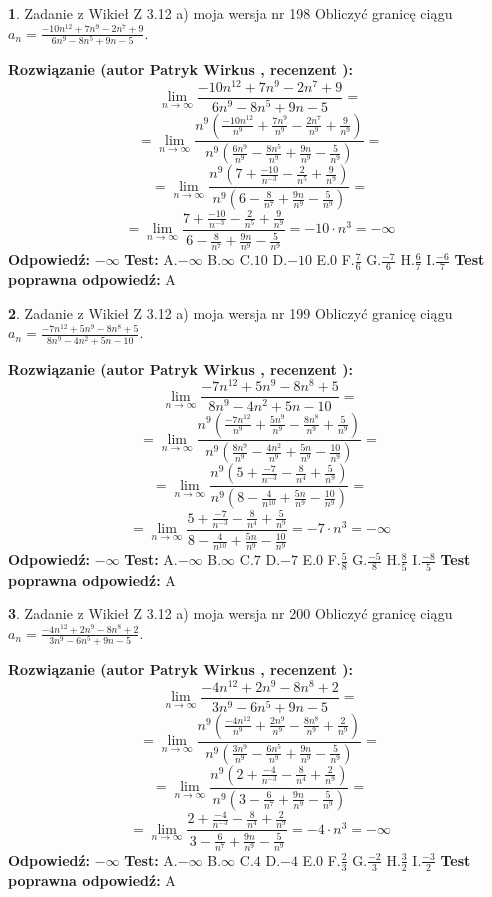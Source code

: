 \documentclass[12pt, a4paper]{article}
\theoremstyle{definition} %
\newtheorem{zad}{}
\newcommand{\zadStart}[1]{\begin{zad}#1\newline}
\newcommand{\zadStop}{\end{zad}}
\newcommand{\rozwStart}[2]{\noindent \textbf{Rozwiązanie (autor #1 , recenzent #2): }\newline}
\newcommand{\rozwStop}{\newline}
\newcommand{\odpStart}{\noindent \textbf{Odpowiedź:}\newline}
\newcommand{\odpStop}{\newline}
\newcommand{\testStart}{\noindent \textbf{Test:}\newline}
\newcommand{\testStop}{\newline}
\newcommand{\kluczStart}{\noindent \textbf{Test poprawna odpowiedź:}\newline}
\newcommand{\kluczStop}{\newline}
\begin{document}
\zadStart{Zadanie z Wikieł Z 3.12 a) moja wersja nr 198}
Obliczyć granicę ciągu $a_{n}=\frac{-10n^{12}+7n^{9}-2n^{7}+9}{6n^{9}-8n^{5}+9n-5}$.
\zadStop
\rozwStart{Patryk Wirkus}{}
$$\lim\limits_{n\to\infty}\frac{-10n^{12}+7n^{9}-2n^{7}+9}{6n^{9}-8n^{5}+9n-5}=$$
$$=\lim\limits_{n\to\infty}\frac{n^{9}\left(\frac{-10n^{12}}{n^{9}}+\frac{7n^{9}}{n^{9}}-\frac{2n^{7}}{n^{9}}+\frac{9}{n^{9}}\right)}{n^{9}\left(\frac{6n^{9}}{n^{9}}-\frac{8n^{5}}{n^{9}}+\frac{9n}{n^{9}}-\frac{5}{n^{9}}\right)}=$$
$$=\lim\limits_{n\to\infty}\frac{n^{9}\left(7+\frac{-10}{n^{-3}}-\frac{2}{n^{5}}+\frac{9}{n^{9}}\right)}
{n^{9}\left(6-\frac{8}{n^{7}}+\frac{9n}{n^{9}}-\frac{5}{n^{9}}\right)}=$$
$$=\lim\limits_{n\to\infty}\frac{7+\frac{-10}{n^{-3}}-\frac{2}{n^{5}}+\frac{9}{n^{9}}}{6-\frac{8}{n^{7}}+\frac{9n}{n^{9}}-\frac{5}{n^{9}}}=-10\cdot n^{3} = -\infty$$
\rozwStop
\odpStart
$-\infty$
\odpStop
\testStart
A.$-\infty$
B.$\infty$
C.$10$
D.$-10$
E.$0$
F.$\frac{7}{6}$
G.$\frac{-7}{6}$
H.$\frac{6}{7}$
I.$\frac{-6}{7}$
\testStop
\kluczStart
A
\kluczStop



\zadStart{Zadanie z Wikieł Z 3.12 a) moja wersja nr 199}
Obliczyć granicę ciągu $a_{n}=\frac{-7n^{12}+5n^{9}-8n^{8}+5}{8n^{9}-4n^{2}+5n-10}$.
\zadStop
\rozwStart{Patryk Wirkus}{}
$$\lim\limits_{n\to\infty}\frac{-7n^{12}+5n^{9}-8n^{8}+5}{8n^{9}-4n^{2}+5n-10}=$$
$$=\lim\limits_{n\to\infty}\frac{n^{9}\left(\frac{-7n^{12}}{n^{9}}+\frac{5n^{9}}{n^{9}}-\frac{8n^{8}}{n^{9}}+\frac{5}{n^{9}}\right)}{n^{9}\left(\frac{8n^{9}}{n^{9}}-\frac{4n^{2}}{n^{9}}+\frac{5n}{n^{9}}-\frac{10}{n^{9}}\right)}=$$
$$=\lim\limits_{n\to\infty}\frac{n^{9}\left(5+\frac{-7}{n^{-3}}-\frac{8}{n^{4}}+\frac{5}{n^{9}}\right)}
{n^{9}\left(8-\frac{4}{n^{10}}+\frac{5n}{n^{9}}-\frac{10}{n^{9}}\right)}=$$
$$=\lim\limits_{n\to\infty}\frac{5+\frac{-7}{n^{-3}}-\frac{8}{n^{4}}+\frac{5}{n^{9}}}{8-\frac{4}{n^{10}}+\frac{5n}{n^{9}}-\frac{10}{n^{9}}}=-7\cdot n^{3} = -\infty$$
\rozwStop
\odpStart
$-\infty$
\odpStop
\testStart
A.$-\infty$
B.$\infty$
C.$7$
D.$-7$
E.$0$
F.$\frac{5}{8}$
G.$\frac{-5}{8}$
H.$\frac{8}{5}$
I.$\frac{-8}{5}$
\testStop
\kluczStart
A
\kluczStop



\zadStart{Zadanie z Wikieł Z 3.12 a) moja wersja nr 200}
Obliczyć granicę ciągu $a_{n}=\frac{-4n^{12}+2n^{9}-8n^{8}+2}{3n^{9}-6n^{5}+9n-5}$.
\zadStop
\rozwStart{Patryk Wirkus}{}
$$\lim\limits_{n\to\infty}\frac{-4n^{12}+2n^{9}-8n^{8}+2}{3n^{9}-6n^{5}+9n-5}=$$
$$=\lim\limits_{n\to\infty}\frac{n^{9}\left(\frac{-4n^{12}}{n^{9}}+\frac{2n^{9}}{n^{9}}-\frac{8n^{8}}{n^{9}}+\frac{2}{n^{9}}\right)}{n^{9}\left(\frac{3n^{9}}{n^{9}}-\frac{6n^{5}}{n^{9}}+\frac{9n}{n^{9}}-\frac{5}{n^{9}}\right)}=$$
$$=\lim\limits_{n\to\infty}\frac{n^{9}\left(2+\frac{-4}{n^{-3}}-\frac{8}{n^{4}}+\frac{2}{n^{9}}\right)}
{n^{9}\left(3-\frac{6}{n^{7}}+\frac{9n}{n^{9}}-\frac{5}{n^{9}}\right)}=$$
$$=\lim\limits_{n\to\infty}\frac{2+\frac{-4}{n^{-3}}-\frac{8}{n^{4}}+\frac{2}{n^{9}}}{3-\frac{6}{n^{7}}+\frac{9n}{n^{9}}-\frac{5}{n^{9}}}=-4\cdot n^{3} = -\infty$$
\rozwStop
\odpStart
$-\infty$
\odpStop
\testStart
A.$-\infty$
B.$\infty$
C.$4$
D.$-4$
E.$0$
F.$\frac{2}{3}$
G.$\frac{-2}{3}$
H.$\frac{3}{2}$
I.$\frac{-3}{2}$
\testStop
\kluczStart
A
\kluczStop
\end{document}
